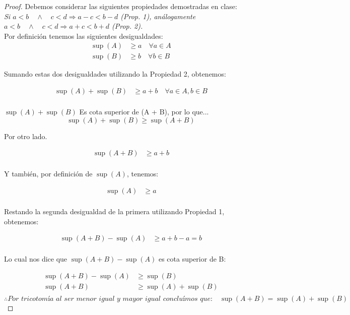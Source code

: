 \documentclass{article}
\begin{document}
\begin{proof} 
Debemos considerar las siguientes propiedades demostradas en clase: \\
\textit{Si \(a<b \quad \land \quad c<d \Rightarrow a-c < b-d\) (Prop. 1), análogamente \(a<b \quad \land \quad c<d \Rightarrow a+c < b+d\) (Prop. 2).} \\
Por definición tenemos las siguientes desigualdades:
\begin{align*}
\sup(A) &\geq a \quad \forall a \in A \\
\sup(B) &\geq b \quad \forall b \in B
\end{align*}


Sumando estas dos desigualdades utilizando la Propiedad 2, obtenemos:


\begin{align*}
\sup(A) + \sup(B) &\geq a + b \quad \forall a \in A, b \in B \\
\end{align*}

\(\sup(A) + \sup(B)\) Es cota superior de (A + B), por lo que...
\[\sup(A) + \sup(B) \geq \sup(A+B)\]

Por otro lado.

\begin{align*}
\sup(A+B) &\geq a + b\\
\end{align*}


Y también, por definición de $\sup(A)$, tenemos:


\begin{align*}
\sup(A) &\geq a\\
\end{align*}


Restando la segunda desigualdad de la primera utilizando Propiedad 1, obtenemos:


\begin{align*}
\sup(A+B) - \sup(A) &\geq a + b - a = b\\
\end{align*}


Lo cual nos dice que \(\sup(A+B) - \sup(A)\) es cota superior de B:

\begin{align*}
    \sup(A+B) - \sup(A) &\geq \sup(B) \\
    \sup(A+B) &\geq \sup(A) + \sup(B) \\
\end{align*}
\[ \therefore \textit{Por tricotomía al ser menor igual y mayor igual concluímos que:} \quad \sup(A+B) = \sup(A) + \sup(B) \]

\end{proof}
\end{document}
